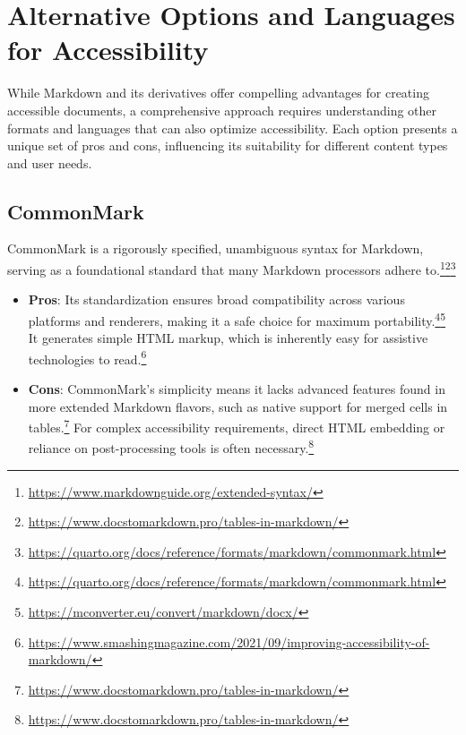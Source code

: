 \section{Alternative Options and Languages for Accessibility}
\label{sec:alt-options-accessibility}

While Markdown and its derivatives offer compelling advantages for creating accessible documents, a comprehensive approach requires understanding other formats and languages that can also optimize accessibility. Each option presents a unique set of pros and cons, influencing its suitability for different content types and user needs.

\subsection{CommonMark}
CommonMark is a rigorously specified, unambiguous syntax for Markdown, serving as a foundational standard that many Markdown processors adhere to.\footnote{\url{https://www.markdownguide.org/extended-syntax/}}\footnote{\url{https://www.docstomarkdown.pro/tables-in-markdown/}}\footnote{\url{https://quarto.org/docs/reference/formats/markdown/commonmark.html}}
\begin{itemize}[noitemsep,topsep=0pt]
    \item \textbf{Pros}: Its standardization ensures broad compatibility across various platforms and renderers, making it a safe choice for maximum portability.\footnote{\url{https://quarto.org/docs/reference/formats/markdown/commonmark.html}}\footnote{\url{https://mconverter.eu/convert/markdown/docx/}} It generates simple HTML markup, which is inherently easy for assistive technologies to read.\footnote{\url{https://www.smashingmagazine.com/2021/09/improving-accessibility-of-markdown/}}
    \item \textbf{Cons}: CommonMark's simplicity means it lacks advanced features found in more extended Markdown flavors, such as native support for merged cells in tables.\footnote{\url{https://www.docstomarkdown.pro/tables-in-markdown/}} For complex accessibility requirements, direct HTML embedding or reliance on post-processing tools is often necessary.\footnote{\url{https://www.docstomarkdown.pro/tables-in-markdown/}}
\end{itemize}


